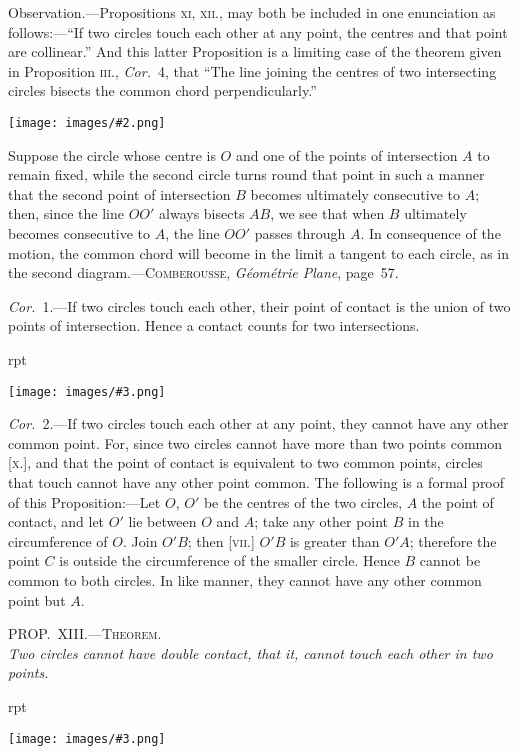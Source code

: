 \documentclass[oneside]{book}
\newcounter{wrapwidth}
\newcommand\myprop[2]{
\bigskip\Needspace*{4\baselineskip}\begin{center}\textsc{#1}\\\medskip\emph{#2}\par\end{center}
}
\newcommand\imgflow[3]{
\setcounter{wrapwidth}{#1}
\begin{wrapfigure}[#2]{r}{\value{wrapwidth}pt}
\begin{center}
\vspace{-0.3in}
\texttt{[image: images/\#3.png]}
\end{center}
\end{wrapfigure}
}
\newcommand\imgcent[2]{
\begin{center}
\texttt{[image: images/\#2.png]}
\end{center}
}
\begin{document}
\begin{footnotesize}
\textsf{Observation.}---Propositions \textsc{xi, xii.}, may both be included in
one enunciation as follows:---``If two circles touch each other at
any point, the centres and that point are collinear.'' And this
latter Proposition is a limiting case of the theorem given in Proposition \textsc{iii.},
\textit{Cor.}~4, that ``The line joining the centres of two
intersecting circles bisects the common chord perpendicularly.''

\imgcent{313}{f116}

Suppose the circle whose centre is $O$ and one of the points of
intersection $A$ to remain fixed, while the second circle turns
round that point in such a manner that the second point of
intersection $B$ becomes ultimately consecutive to $A$; then, since
the line $OO'$ always bisects $AB$, we see that when $B$ ultimately
becomes consecutive to $A$, the line $OO'$ passes through $A$. In
consequence of the motion, the common chord will become in
the limit a tangent to each circle, as in the second diagram.---\textsc{Comberousse},
\textit{G\'eom\'etrie Plane}, page~57.

\textit{Cor.}~1.---If two circles touch each other, their point of contact
is the union of two points of intersection. Hence a contact
counts for two intersections.

\newpage
\imgflow{100}{9}{f117}
\textit{Cor.}~2.---If two circles touch each other at any point, they
cannot have any other common point. For, since two circles
cannot have more than two points
common [\textsc{x.}], and that the point of contact
is equivalent to two common points,
circles that touch cannot have any
other point common. The following is
a formal proof of this Proposition:---Let
$O$, $O'$ be the centres of the two circles,
$A$ the point of contact, and let $O'$ lie
between $O$ and $A$; take any other point
$B$ in the circumference of $O$. Join $O'B$;
then [\textsc{vii.}] $O'B$ is greater than $O'A$; therefore the point $C$ is
outside the circumference of the smaller circle. Hence $B$ cannot
be common to both circles. In like manner, they cannot have
any other common point but $A$.
\par\end{footnotesize}

\myprop{PROP\@.~XIII\@.---Theorem.}{Two circles cannot have double contact, that it, cannot
touch each other in two points.}

\imgflow{120}{9}{f118}
\end{document}
